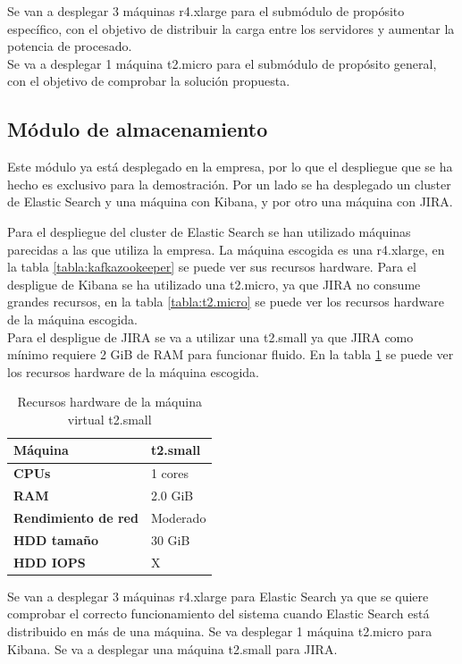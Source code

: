 Se van a desplegar 3 máquinas r4.xlarge para el submódulo de propósito específico, con el objetivo de distribuir la carga entre los servidores y aumentar la potencia de procesado.
\\
Se va a desplegar 1 máquina t2.micro para el submódulo de propósito general, con el objetivo de comprobar la solución propuesta.

\subsection{Módulo de almacenamiento}
Este módulo ya está desplegado en la empresa, por lo que el despliegue que se ha hecho es exclusivo para la demostración. Por un lado se ha desplegado un cluster de Elastic Search y una máquina con Kibana, y por otro una máquina con JIRA.

Para el despliegue del cluster de Elastic Search se han utilizado máquinas parecidas a las que utiliza la empresa. La máquina escogida es una r4.xlarge, en la tabla \ref{tabla:kafkazookeeper} se puede ver sus recursos hardware. Para el despligue de Kibana se ha utilizado una t2.micro, ya que JIRA no consume grandes recursos, en la tabla \ref{tabla:t2.micro} se puede ver los recursos hardware de la máquina escogida.
\\
Para el despligue de JIRA se va a utilizar una t2.small ya que JIRA como mínimo requiere 2 GiB de RAM para funcionar fluido. En la tabla \ref{tabla:t2.small} se puede ver los recursos hardware de la máquina escogida.

\begin{table}[H]\label{tabla:t2.small}
	\centering
	\begin{tabular}{|l|l|}
		\hline
		\textbf{Máquina}            & \textbf{t2.small}      \\ \hline
		\textbf{CPUs}               & 1 cores                \\ \hline
		\textbf{RAM}                & 2.0 GiB                \\ \hline
		\textbf{Rendimiento de red} & Moderado               \\ \hline
		\textbf{HDD tamaño}         & 30 GiB                 \\ \hline
		\textbf{HDD IOPS}           & X                      \\ \hline
	\end{tabular}
	\caption{Recursos hardware de la máquina virtual t2.small}
\end{table}

Se van a desplegar 3 máquinas r4.xlarge para Elastic Search ya que se quiere comprobar el correcto funcionamiento del sistema cuando Elastic Search está distribuido en más de una máquina. Se va desplegar 1 máquina t2.micro para Kibana. Se va a desplegar una máquina t2.small para JIRA.


